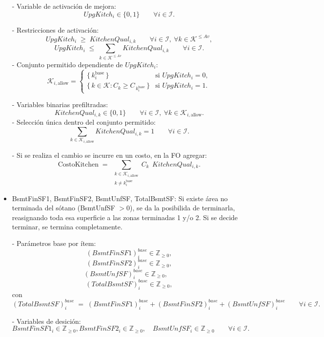 \begin{itemize}
    - Variable de activación de mejora:
    \[
      UpgKitch_i \in \{0,1\} \qquad \forall i \in \mathcal{I}.
    \]

    - Restricciones de activación:
    \[
      UpgKitch_i \;\ge\; KitchenQual_{i,k} \qquad \forall i \in \mathcal{I},\ \forall k \in \mathcal{K}^{\le Av},
    \]
    \[
      UpgKitch_i \;\le\; \sum_{k \in \mathcal{K}^{\le Av}} KitchenQual_{i,k} \qquad \forall i \in \mathcal{I}.
    \]
    - Conjunto permitido dependiente de $UpgKitch_i$:
    \[
      \mathcal{K}_{i,\text{allow}} =
      \begin{cases}
        \{\, k_i^{\text{base}} \,\} & \text{si } UpgKitch_i = 0,\\[4pt]
        \{\, k \in \mathcal{K} : C_k \ge C_{\,k_i^{\text{base}}} \,\} & \text{si } UpgKitch_i = 1.
      \end{cases}
    \]

    - Variables binarias prefiltradas:
    \[
      KitchenQual_{i,k} \in \{0,1\} \qquad \forall i \in \mathcal{I},\ \forall k \in \mathcal{K}_{i,\text{allow}}.
    \]
    - Selección única dentro del conjunto permitido:
    \[
      \sum_{k \in \mathcal{K}_{i,\text{allow}}} KitchenQual_{i,k} = 1 \qquad \forall i \in \mathcal{I}.
    \]

    - Si se realiza el cambio se incurre en un costo, en la FO agregar:
    \[
      \text{CostoKitchen}
      \;=\;
      \sum_{\substack{k \in \mathcal{K}_{i,\text{allow}} \\ k \neq k_i^{\text{base}}}}
      C_k \;\, KitchenQual_{i,k}.
    \]

    \item BsmtFinSF1, BsmtFinSF2, BsmtUnfSF, TotalBsmtSF: Si existe área no terminada del sótano (BsmtUnfSF $> 0$), se da la posibilida de terminarla, reasignando toda esa superficie a las zonas terminadas 1 y/o 2. Si se decide terminar, se termina completamente.

  - Parámetros base por ítem:
  \[
    (BsmtFinSF1)_i^{base} \in \mathbb{Z}_{\ge 0},
\]
 \[
    (BsmtFinSF2)_i^{base} \in \mathbb{Z}_{\ge 0},
\]
  \[
    (BsmtUnfSF)_i^{base} \in \mathbb{Z}_{\ge 0},\quad
    \]
      \[
    (TotalBsmtSF)_i^{base} \in \mathbb{Z}_{\ge 0},
  \]
  con
  \[
    (TotalBsmtSF)_i^{base}
    \;=\;
    (BsmtFinSF1)_i^{base}
    + (BsmtFinSF2)_i^{base}
    + (BsmtUnfSF)_i^{base}
    \qquad \forall i \in \mathcal{I}.
  \]

  - Variables de desición:
  \[
    BsmtFinSF1_{i} \in \mathbb{Z}_{\ge 0},
    BsmtFinSF2_{i} \in \mathbb{Z}_{\ge 0},\quad
    BsmtUnfSF_{i} \in \mathbb{Z}_{\ge 0}
    \qquad \forall i \in \mathcal{I}.
  \]


\end{itemize}

